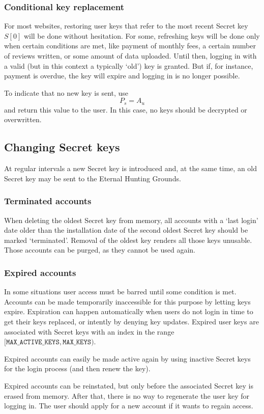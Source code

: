 \subsubsection{Conditional key replacement}
For most websites, restoring user keys that refer to the most recent Secret key $S[0]$ will be done without hesitation.
For some,
refreshing keys will be done only when certain conditions are met,
like payment of monthly fees,
a certain number of reviews written,
or some amount of data uploaded.
Until then,
logging in with a valid
(but in this context a typically `old')
key is granted.
But if, for instance, payment is overdue, the key will expire and logging in is no longer possible.
\par
To indicate that no new key is sent,
use
\[P_s = A_u\]
and return this value to the user.
In this case,
no keys should be decrypted or overwritten.

\subsection{Changing Secret keys}
At regular intervals a new Secret key is introduced and,
at the same time,
an old Secret key may be sent to the Eternal Hunting Grounds.

\subsubsection{Terminated accounts}
When deleting the oldest Secret key from memory,
all accounts with a `last login' date older than the installation
date of the second oldest Secret key should be marked `terminated'.
Removal of the oldest key renders all those keys unusable.
Those accounts can be purged, as they cannot be used again.

\subsubsection{Expired accounts}
In some situations user access must be barred until some condition is met.
Accounts can be made temporarily inaccessible for this purpose by letting keys expire.
Expiration can happen automatically when users do not login in time to get their keys replaced,
or intently by denying key updates.
Expired user keys are associated with Secret keys with an index in the range $[\texttt{MAX\_ACTIVE\_KEYS},\texttt{MAX\_KEYS})$.
\par
Expired accounts can easily be made active again by using inactive Secret keys for the login process (and then renew the key).
\par
Expired accounts can be reinstated,
but only before the associated Secret key is erased from memory.
After that, there is no way to regenerate the user key for logging in.
The user should apply for a new account if it wants to regain access.
